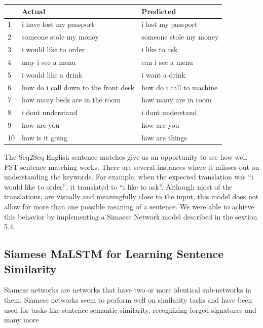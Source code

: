 \documentclass[runningheads]{llncs}
\begin{document}
	\begin{table} 
		\begin{center}
			\begin{tabular}{| l | l | l | |}			
				\hline
				 & Actual \ & Predicted  \\
				 \hline
					1 & i have lost my passport & i lost my passport \\
				    \hline				
					2 & someone stole my money & someone stole my money \\
					\hline
					3 & i would like to order & i like to ask \\
					\hline
					4 & may i see a menu & can i see a menu \\
					\hline
					5 & i would like a drink & i want a drink   \\
					\hline
					6 & how do i call down to the front desk & how do i call to machine    \\
					\hline
				    7 & how many beds are in the room & how many are  in  room       \\
				    \hline
					8 & i dont understand & i dont understand   \\
					\hline
					9 & how are you &  how are you  \\
					\hline
					10 & how is it going & how are things    \\
				\hline
			\end{tabular}
		\end{center}
		\label{table:English Sentence Matches}
	\end{table}

	The Seq2Seq English sentence matches give us an opportunity to see how well PST sentence matching works. There are several instances where it miisses out on understanding the keywords. For example, when the expected translation was “i would like to order”, it translated to “i like to ask”. Although most of the translations, are visually and meaningfully close to the input, this model does not allow for more than one possible meaning of a sentence. We were able to achieve this behavior by implementing a Simaese Network model described in the sextion 5.4.
	
	
	\subsection{Siamese MaLSTM for Learning Sentence Similarity}	
	Siamese networks are networks that have two or more identical sub-networks in them.
	Siamese networks seem to perform well on similarity tasks and have been used for tasks like sentence semantic similarity, recognizing forged signatures and many more
	
\end{document}
